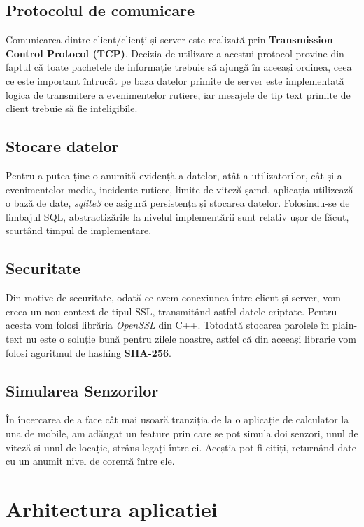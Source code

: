 \documentclass{article}
\begin{document}
\subsection{Protocolul de comunicare}
Comunicarea dintre client/clienți și server este realizată prin  \textbf{Transmission Control Protocol (TCP)}. Decizia de utilizare a acestui protocol provine din faptul că toate pachetele de informație trebuie să ajungă în aceeași ordinea, ceea ce este important întrucât pe baza datelor primite de server este implementată logica de transmitere a evenimentelor rutiere, iar  mesajele de tip text primite de client trebuie să fie inteligibile. 

\subsection{Stocare datelor}
Pentru a putea ține o anumită evidență a datelor, atât a utilizatorilor, cât și a evenimentelor media, incidente rutiere, limite de viteză șamd. aplicația utilizează o bază de date, \textit{sqlite3} ce asigură persistența și stocarea datelor. Folosindu-se de limbajul SQL, abstractizările la nivelul implementării sunt relativ ușor de făcut, scurtând timpul de implementare.

\subsection{Securitate}
Din motive de securitate, odată ce avem conexiunea între client și server, vom creea un nou context de tipul SSL, transmitând astfel datele criptate. Pentru acesta vom folosi librăria \textit{OpenSSL} din C++. Totodată stocarea parolele în plain-text nu este o soluție bună pentru zilele noastre, astfel că din aceeași librarie vom folosi agoritmul de hashing \textbf{SHA-256}.

\subsection{Simularea Senzorilor}
În încercarea de a face cât mai ușoară tranziția de la o aplicație de calculator la una de mobile, am adăugat un feature prin care se pot simula doi senzori, unul de viteză și unul de locație, strâns legați între ei. Aceștia pot fi citiți, returnând date cu un anumit nivel de corentă între ele.

\section{Arhitectura aplicatiei}
\end{document}
